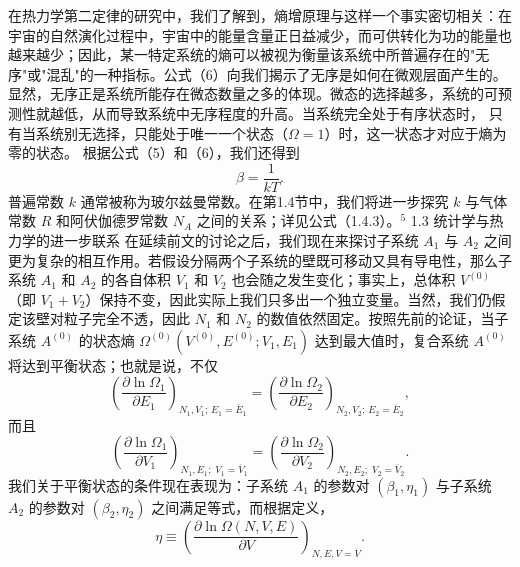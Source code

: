在热力学第二定律的研究中，我们了解到，熵增原理与这样一个事实密切相关：在宇宙的自然演化过程中，宇宙中的能量含量正日益减少，而可供转化为功的能量也越来越少；因此，某一特定系统的熵可以被视为衡量该系统中所普遍存在的"无序"或"混乱"的一种指标。公式（6）向我们揭示了无序是如何在微观层面产生的。显然，无序正是系统所能存在微态数量之多的体现。微态的选择越多，系统的可预测性就越低，从而导致系统中无序程度的升高。当系统完全处于有序状态时，
只有当系统别无选择，只能处于唯一一个状态（\(\Omega = 1\)）时，这一状态才对应于熵为零的状态。
根据公式（5）和（6），我们还得到
\begin{equation}\tag{1.2.11}\label{eq:1.2.11}
\beta = { \frac { 1 } { k T } } .
\end{equation}
普遍常数 \(k\) 通常被称为玻尔兹曼常数。在第1.4节中，我们将进一步探究 \(k\) 与气体常数 \(R\) 和阿伏伽德罗常数 \(N_{A}\) 之间的关系；详见公式（1.4.3）。\(^{5}\)
1.3 统计学与热力学的进一步联系
在延续前文的讨论之后，我们现在来探讨子系统 \(A_{1}\) 与 \(A_{2}\) 之间更为复杂的相互作用。若假设分隔两个子系统的壁既可移动又具有导电性，那么子系统 \(A_{1}\) 和 \(A_{2}\) 的各自体积 \(V_{1}\) 和 \(V_{2}\) 也会随之发生变化；事实上，总体积 \(V^{(0)}\)（即 \(V_{1}+V_{2}\)）保持不变，因此实际上我们只多出一个独立变量。当然，我们仍假定该壁对粒子完全不透，因此 \(N_{1}\) 和 \(N_{2}\) 的数值依然固定。按照先前的论证，当子系统 \(A^{(0)}\) 的状态熵 \(\Omega^{(0)}(V^{(0)},E^{(0)};V_{1},E_{1})\) 达到最大值时，复合系统 \(A^{(0)}\) 将达到平衡状态；也就是说，不仅
\begin{equation}\tag{1.3.1}\label{eq:1.3.1}
\left( \frac { \partial \ln \Omega _ { 1 } } { \partial E _ { 1 } } \right) _ { N _ { 1 } , V _ { 1 } ; \, E _ { 1 } = \overline { { E } } _ { 1 } } = \left( \frac { \partial \ln \Omega _ { 2 } } { \partial E _ { 2 } } \right) _ { N _ { 2 } , V _ { 2 } ; \, E _ { 2 } = \overline { { E } } _ { 2 } } ,
\end{equation}
而且
\begin{equation}\tag{1.3.2}\label{eq:1.3.2}
\left( \frac { \partial \ln \Omega _ { 1 } } { \partial V _ { 1 } } \right) _ { N _ { 1 } , E _ { 1 } ; \; V _ { 1 } = \overline { { V } } _ { 1 } } = \left( \frac { \partial \ln \Omega _ { 2 } } { \partial V _ { 2 } } \right) _ { N _ { 2 } , E _ { 2 } ; \; V _ { 2 } = \overline { { V } } _ { 2 } } .
\end{equation}
我们关于平衡状态的条件现在表现为：子系统 \(A_{1}\) 的参数对 \((\beta_{1},\eta_{1})\) 与子系统 \(A_{2}\) 的参数对 \((\beta_{2},\eta_{2})\) 之间满足等式，而根据定义，
\begin{equation}\tag{1.3.3}\label{eq:1.3.3}
\eta \equiv \left( \frac { \partial \ln \Omega ( N , V , E ) } { \partial V } \right) _ { N , E , V = \overline { { V } } } .
\end{equation}
